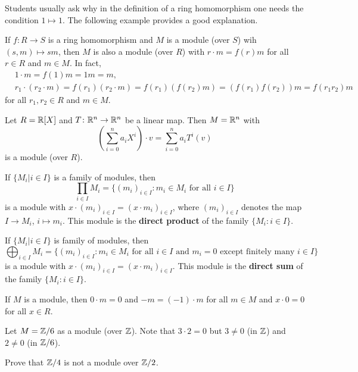 Students usually ask why in the definition of a ring homomorphism one needs
the condition $1\mapsto 1$. The following example provides a good explanation. 

\begin{example}
If $f\colon R\to S$ is a ring homomorphism and $M$ is a module (over $S$) wih 
$(s,m)\mapsto sm$, then 
$M$ is also a module (over $R$) with $r\cdot m=f(r)m$ for all $r\in R$ and $m\in M$. In fact, 
\begin{align*}
&1\cdot m=f(1)m=1m=m,\\
&r_1\cdot (r_2\cdot m)=f(r_1)(r_2\cdot m)=f(r_1)(f(r_2)m)=(f(r_1)f(r_2))m=f(r_1r_2)m
\end{align*}
for all $r_1,r_2\in R$ and $m\in M$.	  	
\end{example}
%
\begin{example}
Let $R=\mathbb{R}[X]$ and $T\colon\mathbb{R}^n\to\mathbb{R}^n$ be a linear map. Then $M=\mathbb{R}^n$ with 
\[
\left(\sum_{i=0}^na_iX^i\right)\cdot v=\sum_{i=0}^na_iT^i(v)
\]	
is a module (over $R$).   
\end{example}

\begin{example}
If $\{M_i|i\in I\}$ is a family of modules, then  	
\[
\prod_{i\in I}M_i=\{(m_i)_{i\in I}:m_i\in M_i\text{ for all $i\in I$}\}
\]
is a module with 
$x\cdot (m_i)_{i\in I}=(x\cdot m_i)_{i\in I}$, 
where $(m_i)_{i\in I}$ denotes the map $I\to M_i$, $i\mapsto m_i$.
This module is the \textbf{direct product} of the family $\{M_i:i\in I\}$.
\end{example}
%
\begin{example}
If $\{M_i|i\in I\}$ is family of modules, then   	
\[
\bigoplus_{i\in I}M_i=\{(m_i)_{i\in I}:m_i\in M_i\text{ for all $i\in I$ and $m_i=0$ except finitely many $i\in I$}\}
\]
is a module with 
$x\cdot (m_i)_{i\in I}=(x\cdot m_i)_{i\in I}$. 
This module is the \textbf{direct sum} of the family $\{M_i:i\in I\}$. 
\end{example}
%
If $M$ is a module, then $0\cdot m=0$ and $-m=(-1)\cdot m$ for all $m\in M$ and 
$x\cdot 0=0$ for all $x\in R$. 
%
\begin{example}
Let $M=\mathbb{Z}/6$ as a module (over $\mathbb{Z}$). Note that 
$3\cdot 2=0$ but $3\ne 0$ (in $\mathbb{Z}$) and $2\ne 0$ (in $\mathbb{Z}/6$).  
\end{example}

\begin{exercise}
	\label{xca:Z4overZ2}
	Prove that $\mathbb{Z}/4$ is not a module over $\mathbb{Z}/2$. 
\end{exercise}

